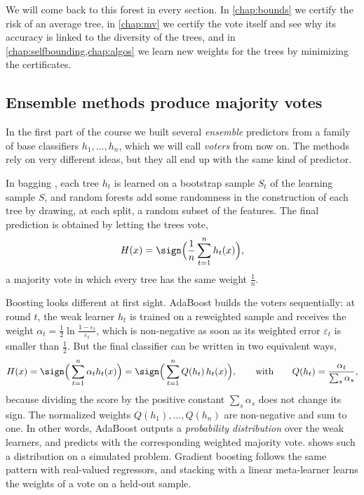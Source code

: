 \begin{running}
We will come back to this forest in every section. In \cref{chap:bounds} we
certify the risk of an average tree, in \cref{chap:mv} we certify the vote itself
and see why its accuracy is linked to the diversity of the trees, and in
\cref{chap:selfbounding,chap:algos} we learn new weights for the trees by
minimizing the certificates.
\end{running}

\subsection{Ensemble methods produce majority votes}

In the first part of the course we built several \emph{ensemble} predictors from
a family of base classifiers $h_1,\dots,h_n$, which we will call \emph{voters}
from now on. The methods rely on very different ideas, but they all end up with
the same kind of predictor.

In bagging \citep{breiman1996bagging}, each tree $h_t$ is learned on a bootstrap
sample $S_t$ of the learning sample $S$, and random forests \citep{breiman2001random}
add some randomness in the construction of each tree by drawing, at each split,
a random subset of the features. The final prediction is obtained by letting the
trees vote,
\[
  H(x)=\sign\Big(\frac1n\sum_{t=1}^n h_t(x)\Big),
\]
a majority vote in which every tree has the same weight $\frac1n$.

Boosting looks different at first sight. AdaBoost \citep{freund1997decision}
builds the voters sequentially: at round $t$, the weak learner $h_t$ is trained on
a reweighted sample and receives the weight
$\alpha_t=\frac12\ln\frac{1-\varepsilon_t}{\varepsilon_t}$, which is non-negative as soon
as its weighted error $\varepsilon_t$ is smaller than $\frac12$. But the final
classifier can be written in two equivalent ways,
\[
  H(x)=\sign\Big(\sum_{t=1}^n \alpha_t h_t(x)\Big)
      =\sign\Big(\sum_{t=1}^n Q(h_t)\, h_t(x)\Big),
  \qquad\text{with}\qquad Q(h_t)=\frac{\alpha_t}{\sum_{s}\alpha_s},
\]
because dividing the score by the positive constant $\sum_s\alpha_s$ does not
change its sign. The normalized weights $Q(h_1),\dots,Q(h_n)$ are non-negative
and sum to one. In other words, AdaBoost outputs a \emph{probability
distribution} over the weak learners, and predicts with the corresponding
weighted majority vote.  shows such a distribution on a
simulated problem. Gradient boosting \citep{friedman2001greedy} follows the same
pattern with real-valued regressors, and stacking \citep{wolpert1992stacked}
with a linear meta-learner learns the weights of a vote on a held-out sample.

